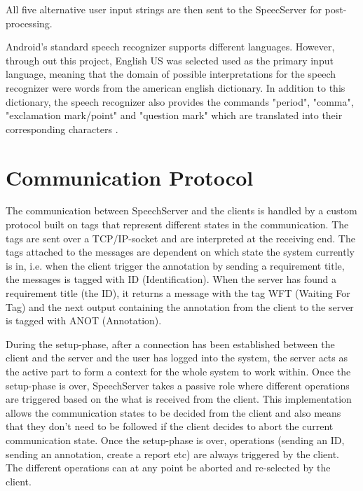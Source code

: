 All five alternative user input strings are then sent to the SpeecServer for post-processing.

Android's standard speech recognizer supports different languages. 
However, through out this project, English US was selected used as the primary input language, meaning that the domain of possible interpretations for the speech recognizer were words from the american english dictionary. 
In addition to this dictionary, the speech recognizer also provides the commands "period", "comma", "exclamation mark/point" and "question mark" which are translated into their corresponding characters \citep{typetextbyspeaking}.

\section{Communication Protocol}
\label{sec:comprot}
The communication between SpeechServer and the clients is handled by a custom protocol built on tags that represent different states in the communication. 
The tags are sent over a TCP/IP-socket and are interpreted at the receiving end.
The tags attached to the messages are dependent on which state the system currently is in, i.e. when the client trigger the annotation by sending a requirement title, the messages is tagged with ID (Identification). When the server has found a requirement title (the ID), it returns a message with the tag WFT (Waiting For Tag) and the next output containing the annotation from the client to the server is tagged with ANOT (Annotation). 

During the setup-phase, after a connection has been established between the client and the server and the user has logged into the system, the server acts as the active part to form a context for the whole system to work within. 
Once the setup-phase is over, SpeechServer takes a passive role where different operations are triggered based on the what is received from the client. %
This implementation allows the communication states to be decided from the client and also means that they don't need to be followed if the client decides to abort the current communication state. Once the setup-phase is over, operations (sending an ID, sending an annotation, create a report etc) are always triggered by the client. The different operations can at any point be aborted and re-selected by the client.
